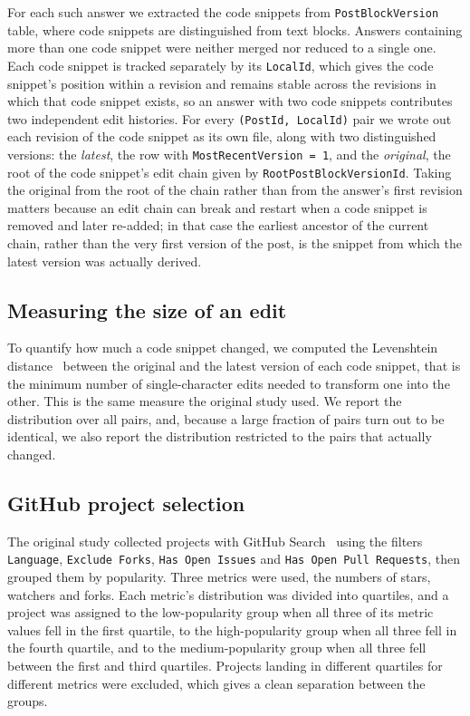 \documentclass[onecolumn,11pt]{IEEEtran}
\begin{document}
For each such answer we extracted the code snippets from \texttt{PostBlockVersion} table, where code snippets are distinguished from text blocks.
Answers containing more than one code snippet were neither merged nor reduced to a single one.
Each code snippet is tracked separately by its \texttt{LocalId}, which gives the code snippet's position within a revision and remains stable across the revisions in which that code snippet exists, so an answer with two code snippets contributes two independent edit histories.
For every \texttt{(PostId, LocalId)} pair we wrote out each revision of the code snippet as its own file, along with two distinguished versions: the \emph{latest}, the row with \texttt{MostRecentVersion = 1}, and the \emph{original}, the root of the code snippet's edit chain given by \texttt{RootPostBlockVersionId}.
Taking the original from the root of the chain rather than from the answer's first revision matters because an edit chain can break and restart when a code snippet is removed and later re-added; in that case the earliest ancestor of the current chain, rather than the very first version of the post, is the snippet from which the latest version was actually derived.

\subsection{Measuring the size of an edit}

To quantify how much a code snippet changed, we computed the Levenshtein distance~\cite{levenshtein1966binary} between the original and the latest version of each code snippet, that is the minimum number of single-character edits needed to transform one into the other.
This is the same measure the original study used.
We report the distribution over all pairs, and, because a large fraction of pairs turn out to be identical, we also report the distribution restricted to the pairs that actually changed.

\subsection{GitHub project selection}

The original study collected projects with GitHub Search~\cite{dabic2021ghs} using the filters \texttt{Language}, \texttt{Exclude Forks}, \texttt{Has Open Issues} and \texttt{Has Open Pull Requests}, then grouped them by popularity.
Three metrics were used, the numbers of stars, watchers and forks.
Each metric's distribution was divided into quartiles, and a project was assigned to the low-popularity group when all three of its metric values fell in the first quartile, to the high-popularity group when all three fell in the fourth quartile, and to the medium-popularity group when all three fell between the first and third quartiles.
Projects landing in different quartiles for different metrics were excluded, which gives a clean separation between the groups.
\end{document}
